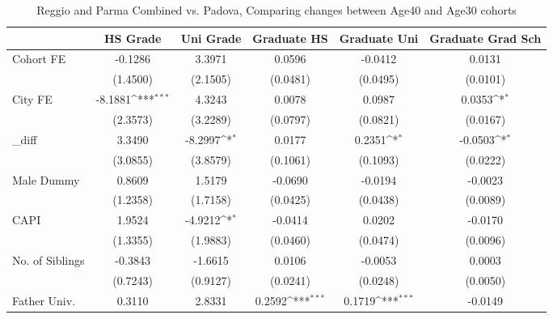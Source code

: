 \begin{table}[htbp]\centering
\def\sym#1{\ifmmode^{#1}\else\(^{#1}\)\fi}
\caption{Reggio and Parma Combined vs. Padova, Comparing changes between Age40 and Age30 cohorts}
\begin{tabular}{l*{5}{c}}
\toprule
            &\multicolumn{1}{c}{HS Grade}&\multicolumn{1}{c}{Uni Grade}&\multicolumn{1}{c}{Graduate HS}&\multicolumn{1}{c}{Graduate Uni}&\multicolumn{1}{c}{Graduate Grad Sch}\\
\midrule
Cohort FE   &     -0.1286         &      3.3971         &      0.0596         &     -0.0412         &      0.0131         \\
            &    (1.4500)         &    (2.1505)         &    (0.0481)         &    (0.0495)         &    (0.0101)         \\
\addlinespace
City FE     &     -8.1881\sym{***}&      4.3243         &      0.0078         &      0.0987         &      0.0353\sym{*}  \\
            &    (2.3573)         &    (3.2289)         &    (0.0797)         &    (0.0821)         &    (0.0167)         \\
\addlinespace
\_diff       &      3.3490         &     -8.2997\sym{*}  &      0.0177         &      0.2351\sym{*}  &     -0.0503\sym{*}  \\
            &    (3.0855)         &    (3.8579)         &    (0.1061)         &    (0.1093)         &    (0.0222)         \\
\addlinespace
Male Dummy  &      0.8609         &      1.5179         &     -0.0690         &     -0.0194         &     -0.0023         \\
            &    (1.2358)         &    (1.7158)         &    (0.0425)         &    (0.0438)         &    (0.0089)         \\
\addlinespace
CAPI        &      1.9524         &     -4.9212\sym{*}  &     -0.0414         &      0.0202         &     -0.0170         \\
            &    (1.3355)         &    (1.9883)         &    (0.0460)         &    (0.0474)         &    (0.0096)         \\
\addlinespace
No. of Siblings&     -0.3843         &     -1.6615         &      0.0106         &     -0.0053         &      0.0003         \\
            &    (0.7243)         &    (0.9127)         &    (0.0241)         &    (0.0248)         &    (0.0050)         \\
\addlinespace
Father Univ.&      0.3110         &      2.8331         &      0.2592\sym{***}&      0.1719\sym{***}&     -0.0149         \\

\end{tabular}
\end{table}
